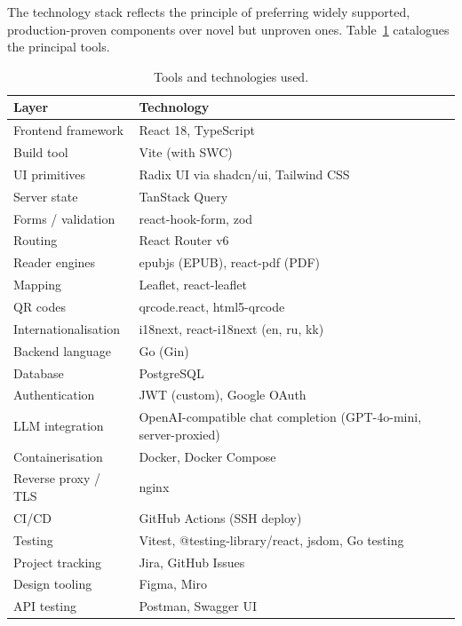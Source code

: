 \documentclass[12pt,a4paper]{report}
\begin{document}
The technology stack reflects the principle of preferring widely
supported, production-proven components over novel but unproven ones.
Table~\ref{tab:stack} catalogues the principal tools.

\begin{table}[H]
\centering
\caption{Tools and technologies used.}
\label{tab:stack}
\small
\begin{tabularx}{\textwidth}{l X}
\toprule
\textbf{Layer} & \textbf{Technology} \\
\midrule
Frontend framework      & React 18, TypeScript \\
Build tool              & Vite (with SWC) \\
UI primitives           & Radix UI via shadcn/ui, Tailwind CSS \\
Server state            & TanStack Query \\
Forms / validation      & react-hook-form, zod \\
Routing                 & React Router v6 \\
Reader engines          & epubjs (EPUB), react-pdf (PDF) \\
Mapping                 & Leaflet, react-leaflet \\
QR codes                & qrcode.react, html5-qrcode \\
Internationalisation    & i18next, react-i18next (en, ru, kk) \\
Backend language        & Go (Gin) \\
Database                & PostgreSQL \\
Authentication          & JWT (custom), Google OAuth \\
LLM integration         & OpenAI-compatible chat completion (GPT-4o-mini, server-proxied) \\
Containerisation        & Docker, Docker Compose \\
Reverse proxy / TLS     & nginx \\
CI/CD                   & GitHub Actions (SSH deploy) \\
Testing                 & Vitest, @testing-library/react, jsdom, Go testing \\
Project tracking        & Jira, GitHub Issues \\
Design tooling          & Figma, Miro \\
API testing             & Postman, Swagger UI \\
\bottomrule
\end{tabularx}
\end{table}
\end{document}
